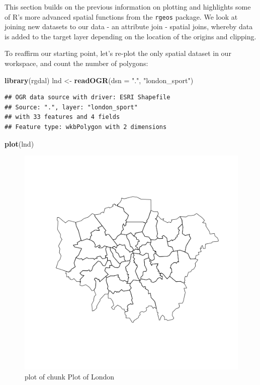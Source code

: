 \documentclass[]{article}
\makeatletter
\newenvironment{Shaded}{}{}
\newcommand{\KeywordTok}[1]{\textcolor[rgb]{0.00,0.44,0.13}{\textbf{{#1}}}}
\newcommand{\DataTypeTok}[1]{\textcolor[rgb]{0.56,0.13,0.00}{{#1}}}
\newcommand{\StringTok}[1]{\textcolor[rgb]{0.25,0.44,0.63}{{#1}}}
\newcommand{\NormalTok}[1]{{#1}}
\def\maxwidth{\ifdim\Gin@nat@width>\linewidth\linewidth
\else\Gin@nat@width\fi}
\let\Oldincludegraphics\includegraphics
\renewcommand{\includegraphics}[1]{\Oldincludegraphics[width=\maxwidth]{#1}}
\makeatother
\begin{document}
This section builds on the previous information on plotting and
highlights some of R's more advanced spatial functions from the
\texttt{rgeos} package. We look at joining new datasets to our data - an
attribute join - spatial joins, whereby data is added to the target
layer depending on the location of the origins and clipping.

To reaffirm our starting point, let's re-plot the only spatial dataset
in our workspace, and count the number of polygons:

\begin{Shaded}
\begin{Highlighting}[]
\KeywordTok{library}\NormalTok{(rgdal)}
\NormalTok{lnd <- }\KeywordTok{readOGR}\NormalTok{(}\DataTypeTok{dsn =} \StringTok{"."}\NormalTok{, }\StringTok{"london_sport"}\NormalTok{)}
\end{Highlighting}
\end{Shaded}
\begin{verbatim}
## OGR data source with driver: ESRI Shapefile 
## Source: ".", layer: "london_sport"
## with 33 features and 4 fields
## Feature type: wkbPolygon with 2 dimensions
\end{verbatim}
\begin{Shaded}
\begin{Highlighting}[]
\KeywordTok{plot}\NormalTok{(lnd)}
\end{Highlighting}
\end{Shaded}
\begin{figure}[htbp]
\centering
\includegraphics{figure/Plot_of_London.png}
\caption{plot of chunk Plot of London}
\end{figure}
\end{document}
